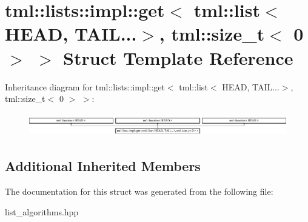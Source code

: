 \hypertarget{structtml_1_1lists_1_1impl_1_1get_3_01tml_1_1list_3_01HEAD_00_01TAIL_8_8_8_4_00_01tml_1_1size__t_3_010_01_4_01_4}{\section{tml\+:\+:lists\+:\+:impl\+:\+:get$<$ tml\+:\+:list$<$ H\+E\+A\+D, T\+A\+I\+L...$>$, tml\+:\+:size\+\_\+t$<$ 0 $>$ $>$ Struct Template Reference}
\label{structtml_1_1lists_1_1impl_1_1get_3_01tml_1_1list_3_01HEAD_00_01TAIL_8_8_8_4_00_01tml_1_1size__t_3_010_01_4_01_4}
}
Inheritance diagram for tml\+:\+:lists\+:\+:impl\+:\+:get$<$ tml\+:\+:list$<$ H\+E\+A\+D, T\+A\+I\+L...$>$, tml\+:\+:size\+\_\+t$<$ 0 $>$ $>$\+:\begin{figure}[H]
\begin{center}
\leavevmode
\includegraphics[height=1.017257cm]{structtml_1_1lists_1_1impl_1_1get_3_01tml_1_1list_3_01HEAD_00_01TAIL_8_8_8_4_00_01tml_1_1size__t_3_010_01_4_01_4}
\end{center}
\end{figure}
\subsection*{Additional Inherited Members}


The documentation for this struct was generated from the following file\+:\begin{DoxyCompactItemize}
\item 
list\+\_\+algorithms.\+hpp\end{DoxyCompactItemize}
